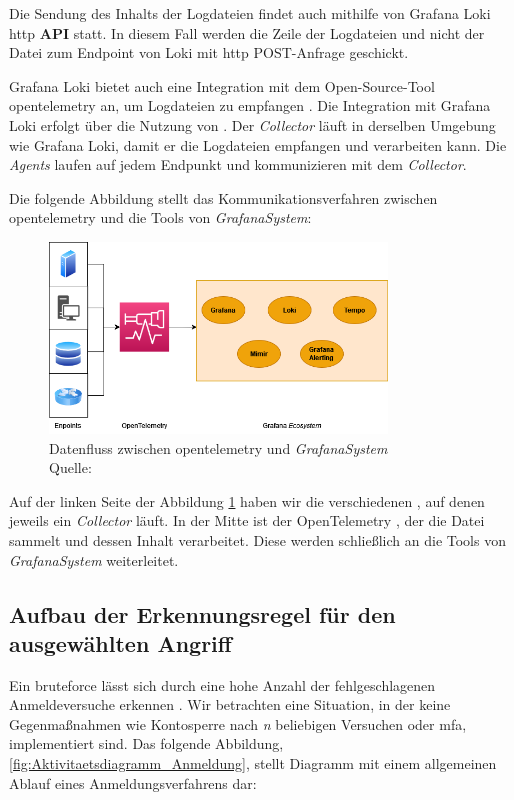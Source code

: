 Die Sendung des Inhalts der Logdateien findet auch mithilfe von Grafana Loki \gls{http} \textbf{\gls{API}} statt. In diesem Fall werden die Zeile der Logdateien und nicht der Datei zum \gls{Endpoint} von Loki mit \gls{http} POST-Anfrage geschickt.

Grafana Loki bietet auch eine Integration mit dem Open-Source-Tool \gls{opentelemetry} an, um Logdateien zu empfangen \citep{Grafana_opentelemetry}. Die Integration mit Grafana Loki erfolgt über die Nutzung von . Der \textit{Collector} läuft in derselben Umgebung wie Grafana Loki, damit er die Logdateien empfangen und verarbeiten kann. Die \textit{Agents} laufen auf jedem Endpunkt und kommunizieren mit dem \textit{Collector}.

\newpage
Die folgende Abbildung stellt das Kommunikationsverfahren zwischen \gls{opentelemetry} und die Tools von \textit{\gls{GrafanaSystem}}:

\begin{figure}[H]
   \centering
   \includegraphics[width=0.8\textwidth]{assets/OpenTelemtry.png}
   \caption[Datenfluss zwischen \gls{opentelemetry} und die Tools von \textit{\gls{GrafanaSystem}}]
   {Datenfluss zwischen \gls{opentelemetry} und \textit{\gls{GrafanaSystem}}\\Quelle: \citep{Grafana_WhatOpentelemetry}}
   \label{fig:UsingOpenTelemetry}
   \centering
\end{figure}


Auf der linken Seite der Abbildung \ref{fig:UsingOpenTelemetry} haben wir die verschiedenen , auf denen jeweils ein \textit{Collector} läuft. In der Mitte ist der OpenTelemetry , der die Datei sammelt und dessen Inhalt verarbeitet. Diese werden schließlich an die Tools von \textit{\gls{GrafanaSystem}} weiterleitet.

\newpage
\subsection{Aufbau der Erkennungsregel für den ausgewählten Angriff}
Ein \gls{bruteforce} lässt sich durch eine hohe Anzahl der fehlgeschlagenen Anmeldeversuche erkennen \citep{Selvaganesh_SplunkBruteForce}. Wir betrachten eine Situation, in der keine Gegenmaßnahmen wie Kontosperre nach \textit{n} beliebigen Versuchen oder \gls{mfa}, implementiert sind. Das folgende Abbildung, \ref{fig:Aktivitaetsdiagramm_Anmeldung}, stellt Diagramm mit einem allgemeinen Ablauf eines Anmeldungsverfahrens dar:

